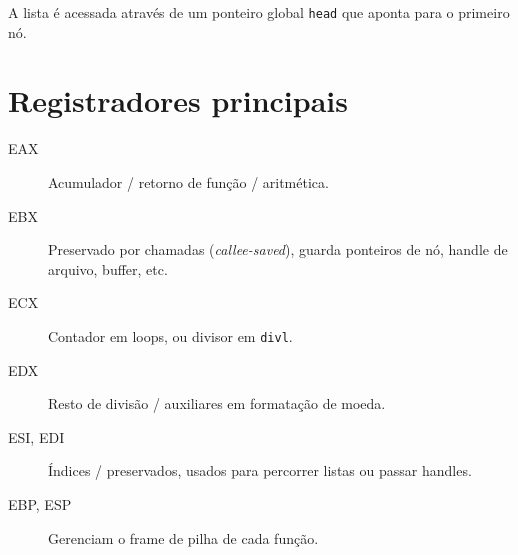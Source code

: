 \documentclass[12pt]{article}
\begin{document}
A lista é acessada através de um ponteiro global \texttt{head} que aponta para o primeiro nó.

\section{Registradores principais}
    \begin{description}
      \item[EAX] Acumulador / retorno de função / aritmética.
      \item[EBX] Preservado por chamadas (\emph{callee-saved}), guarda ponteiros de nó, handle de arquivo, buffer, etc.
      \item[ECX] Contador em loops, ou divisor em \texttt{divl}.
      \item[EDX] Resto de divisão / auxiliares em formatação de moeda.
      \item[ESI, EDI] Índices / preservados, usados para percorrer listas ou passar handles.
      \item[EBP, ESP] Gerenciam o frame de pilha de cada função.
    \end{description}
\end{document}
